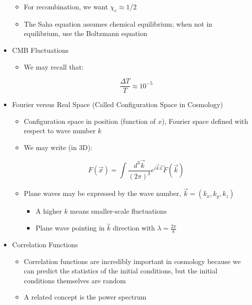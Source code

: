 \begin{itemize}
\begin{itemize}
      \item For recombination, we want $\chi_e\approx 1/2$

      \item The Saha equation assumes chemical equilibrium; when not in equilibrium, use the Boltzmann equation

    \end{itemize}

  \item CMB Fluctuations

    \begin{itemize}

      \item We may recall that:

        $$\frac{\Delta T}{T}\approx 10^{-5}$$

    \end{itemize}

  \item Fourier versus Real Space (Called Configuration Space in Cosmology)

    \begin{itemize}

      \item Configuration space in position (function of $x$), Fourier space defined with respect to wave number $k$

      \item We may write (in 3D):

        $$F(\vec{x})=\int\frac{d^3\vec{k}}{(2\pi)^{3}}e^{i\vec{k}\vec{x}}\tilde{F}(\vec{k})$$

      \item Plane waves may be expressed by the wave number, $\vec{k}=(k_x,k_y,k_z)$

        \begin{itemize}

          \item A higher $k$ means smaller-scale fluctuations

          \item Plane wave pointing in $\hat{k}$ direction with $\lambda=\frac{2\pi}{k}$

        \end{itemize}

    \end{itemize}

  \item Correlation Functions

    \begin{itemize}

      \item Correlation functions are incredibly important in cosmology because we can predict the statistics of the initial conditions, but the initial conditions themselves are random

      \item A related concept is the power spectrum

    \end{itemize}

\end{itemize}



